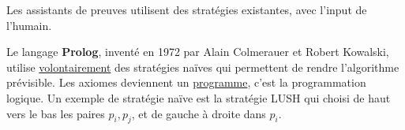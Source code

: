 Les assistants de preuves utilisent des stratégies existantes, avec l'input de l'humain.

Le langage \textbf{Prolog}, inventé en 1972 par Alain Colmerauer et Robert Kowalski, utilise \underline{volontairement} des stratégies naïves qui permettent de rendre l'algorithme prévisible. Les axiomes deviennent un \underline{programme}, c'est la programmation logique. Un exemple de stratégie naïve est la stratégie LUSH qui choisi de haut vers le bas les paires $p_i, p_j$, et de gauche à droite dans $p_i$.
